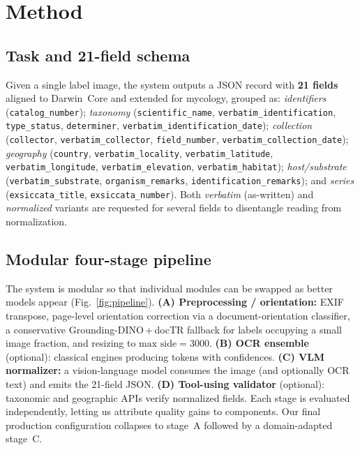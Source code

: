 \section{Method}
\label{sec:method}

\subsection{Task and 21-field schema}
Given a single label image, the system outputs a JSON record with
\textbf{21 fields} aligned to Darwin~Core and extended for mycology, grouped as:
\emph{identifiers} (\texttt{catalog\_number});
\emph{taxonomy} (\texttt{scientific\_name},
\texttt{verbatim\_identification}, \texttt{type\_status}, \texttt{determiner},
\texttt{verbatim\_identification\_date});
\emph{collection} (\texttt{collector}, \texttt{verbatim\_collector},
\texttt{field\_number}, \texttt{verbatim\_collection\_date});
\emph{geography} (\texttt{country}, \texttt{verbatim\_locality},
\texttt{verbatim\_latitude}, \texttt{verbatim\_longitude},
\texttt{verbatim\_elevation}, \texttt{verbatim\_habitat});
\emph{host/substrate} (\texttt{verbatim\_substrate}, \texttt{organism\_remarks},
\texttt{identification\_remarks}); and
\emph{series} (\texttt{exsiccata\_title}, \texttt{exsiccata\_number}).
Both \emph{verbatim} (as-written) and \emph{normalized} variants are requested
for several fields to disentangle reading from normalization.

\subsection{Modular four-stage pipeline}
The system is modular so that individual modules can be swapped as better models
appear (Fig.~\ref{fig:pipeline}). \textbf{(A) Preprocessing / orientation:}
EXIF transpose, page-level orientation correction via a document-orientation
classifier, a conservative Grounding-DINO\,+\,docTR fallback for labels
occupying a small image fraction, and resizing to $\text{max side}=3000$.
\textbf{(B) OCR ensemble} (optional): classical engines producing tokens with
confidences. \textbf{(C) VLM normalizer:} a vision-language model consumes the
image (and optionally OCR text) and emits the 21-field JSON. \textbf{(D)
Tool-using validator} (optional): taxonomic and geographic APIs verify
normalized fields. Each stage is evaluated independently, letting us attribute
quality gains to components. Our final production configuration collapses to
stage~A followed by a domain-adapted stage~C.

